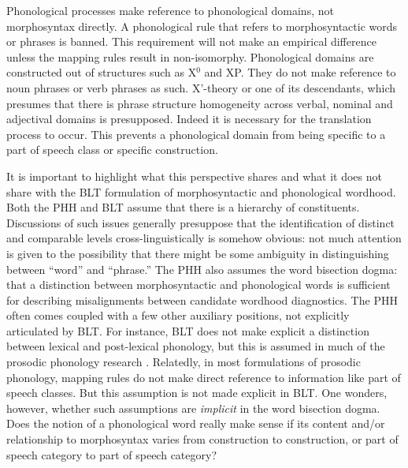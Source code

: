 \documentclass[output=paper,hidelinks]{langscibook}
\begin{document}
Phonological processes make reference to phonological domains, not morphosyntax directly. A phonological rule that refers to morphosyntactic words or phrases is banned. This requirement will not make an empirical difference unless the mapping rules result in non-isomorphy. Phonological domains are constructed out of structures such as X$^0$ and XP. They do not make reference to noun phrases or verb phrases as such. X'-theory or one of its descendants, which presumes that there is phrase structure homogeneity across verbal, nominal and adjectival domains is presupposed. Indeed it is necessary for the translation process to occur. This prevents a phonological domain from being specific to a part of speech class or specific construction. 

It is important to highlight what this perspective shares and what it does not share with the BLT formulation of morphosyntactic and phonological wordhood. Both the PHH and BLT assume that there is a hierarchy of constituents. Discussions of such issues generally presuppose that the identification of distinct and comparable levels cross-linguistically is somehow obvious: not much attention is given to the possibility that there might be some ambiguity in distinguishing between ``word'' and ``phrase.'' The PHH also assumes the word bisection dogma: that a distinction between morphosyntactic and phonological words is sufficient for describing misalignments between candidate wordhood diagnostics. The PHH often comes coupled with a few other auxiliary positions, not explicitly articulated by BLT. For instance, BLT does not make explicit a distinction between lexical and post-lexical phonology, but this is assumed in much of the prosodic phonology research \citep{scheer2010guide}. Relatedly, in most formulations of prosodic phonology, mapping rules do not make direct reference to information like part of speech classes. But this assumption is not made explicit in BLT. One wonders, however, whether such assumptions are \textit{implicit} in the word bisection dogma. Does the notion of a phonological word really make sense if its content and/or relationship to morphosyntax varies from construction to construction, or part of speech category to part of speech category?
\end{document}
